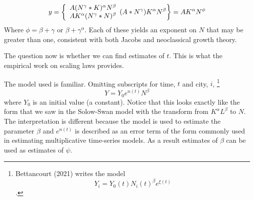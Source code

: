 \begin{equation}
  y=\left\{
  \begin{array}{l}
    A (N^\gamma* K)^\alpha  N^\beta\\
    A K^\alpha (N^\gamma* N)^\beta
  \end{array}
     (A*N^\gamma) K^\alpha N^\beta\\
  \right\} =  AK^\alpha N^\phi
\end{equation}    
Where $\phi=\beta +\gamma$ or $\beta +\gamma^\alpha$. Each of these yields an exponent on $N$ that may be greater than one, consistent with both Jacobs and neoclassical growth theory. 

The question now is whether we can find estimates of $t$. This is what the empirical work on scaling laws provides.

The model used is familiar. Omitting subscripts for time, $t$ and city, $i$, \footnote{Bettancourt (2021) writes the model \[Y_i = Y_0(t)N_i(t)^\beta e^{\xi(t)}\].}
\[Y = Y_0e^{n(t)}N^\beta\]
where $Y_0$ is an initial value (a constant). Notice that this looks exactly like the form that we saw in the 
\gls{Solow-Swan model} with the transform from $K^\alpha L^\beta$ to $N$.  The interpretation is different because the model is used to estimate the parameter $\beta$ and $e^{n(t)}$ is described  as an error term of the form commonly used in estimating multiplicative time-series models. As a result estimates of $\beta$  can be used as estimates  of $\psi$.


